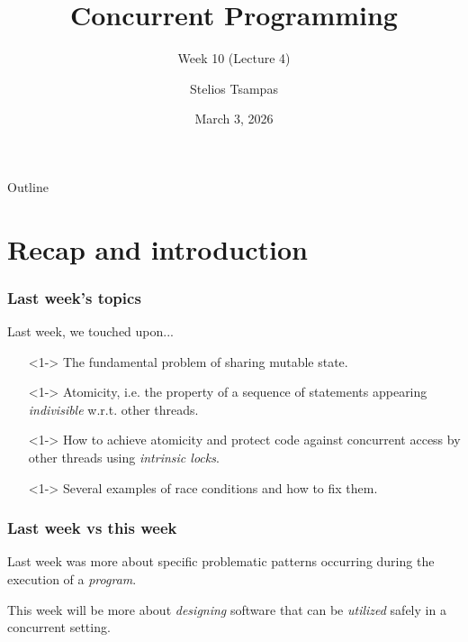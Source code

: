 \documentclass[xcolor={dvipsnames,svgnames},aspectratio=169]{beamer}
\title{Concurrent Programming}
\subtitle{Week 10 (Lecture 4)}
\author{Stelios Tsampas}
\institute{
  \faEnvelope \; stelios@imada.sdu.dk
  \\\\\
  \faGlobe \;
  \href{https://www.steliostsampas.com}{https://www.steliostsampas.com}
  \\\\\
  \faGithub \; stelios-tau/cp-2026
}
\date{March 3, 2026}
\begin{document}
\frame{\titlepage}

\def\firstcircle{(0,0) circle (2cm)}
\def\secondcircle{(1.4,1.4) circle (2cm)}
\def\thirdcircle{(0:2.4) circle (2cm)}

\begin{frame}{Outline}
  \tableofcontents
\end{frame}

\section{Recap and introduction}

\begin{frame}[fragile]
  \frametitle{Last week's topics}

  Last week, we touched upon...

  \begin{itemize}
  \item[\faBook]<1-> The fundamental problem of sharing mutable state.
  \item[\faBook]<1-> Atomicity, i.e. the property of a sequence of
    statements appearing \emph{indivisible} w.r.t. other threads.
  \item[\faBook]<1-> How to achieve atomicity and protect code against
    concurrent access by other threads using \emph{intrinsic locks}.
  \item[\faUserInjured]<1-> Several examples of race conditions and how to fix them.
  \end{itemize}
\end{frame}

\begin{frame}[fragile]
  \frametitle{Last week vs this week}

  \large{Last week was more about specific problematic patterns occurring during
    the execution of a \emph{program}.}

  \pause

  \large{This week will be more about \emph{designing} software that can be
    \emph{utilized} safely in a concurrent setting.}

\end{frame}
\end{document}
